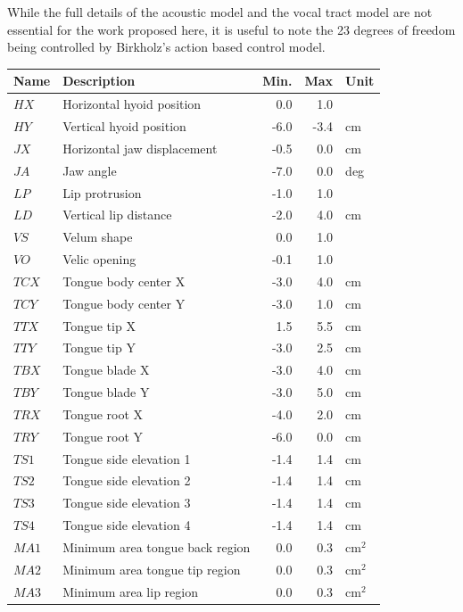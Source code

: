 \documentclass{article}
\begin{document}
While the full details of the acoustic model
and the vocal tract model are not
essential for the work proposed here,
it is useful to note
the 23 degrees of freedom
being controlled by Birkholz's
action based control model.

\begin{tabular}{llrrl}
\toprule
{\bf Name} & {\bf Description} & {\bf Min.} & {\bf Max} & {\bf Unit} \\
\midrule
$HX$ & Horizontal hyoid position & 0.0 & 1.0 & \\
$HY$ & Vertical hyoid position & -6.0 & -3.4 & cm \\
$JX$ & Horizontal jaw displacement & -0.5 & 0.0 & cm \\
$JA$ & Jaw angle & -7.0 & 0.0 & deg \\
$LP$ & Lip protrusion & -1.0 & 1.0 & \\
$LD$ & Vertical lip distance & -2.0 & 4.0 & cm \\
$VS$ & Velum shape & 0.0 & 1.0 & \\
$VO$ & Velic opening & -0.1 & 1.0 & \\
$TCX$ & Tongue body center X & -3.0 & 4.0 & cm \\
$TCY$ & Tongue body center Y & -3.0 & 1.0 & cm \\
$TTX$ & Tongue tip X & 1.5 & 5.5 & cm \\
$TTY$ & Tongue tip Y & -3.0 & 2.5 & cm \\
$TBX$ & Tongue blade X & -3.0 & 4.0 & cm \\
$TBY$ & Tongue blade Y & -3.0 & 5.0 & cm \\
$TRX$ & Tongue root X & -4.0 & 2.0 & cm \\
$TRY$ & Tongue root Y & -6.0 & 0.0 & cm \\
$TS1$ & Tongue side elevation 1 & -1.4 & 1.4 & cm \\
$TS2$ & Tongue side elevation 2 & -1.4 & 1.4 & cm \\
$TS3$ & Tongue side elevation 3 & -1.4 & 1.4 & cm \\
$TS4$ & Tongue side elevation 4 & -1.4 & 1.4 & cm \\
$MA1$ & Minimum area tongue back region & 0.0 & 0.3 & cm$^2$ \\
$MA2$ & Minimum area tongue tip region & 0.0 & 0.3 & cm$^2$ \\
$MA3$ & Minimum area lip region & 0.0 & 0.3 & cm$^2$ \\
\bottomrule
\end{tabular}
\end{document}
